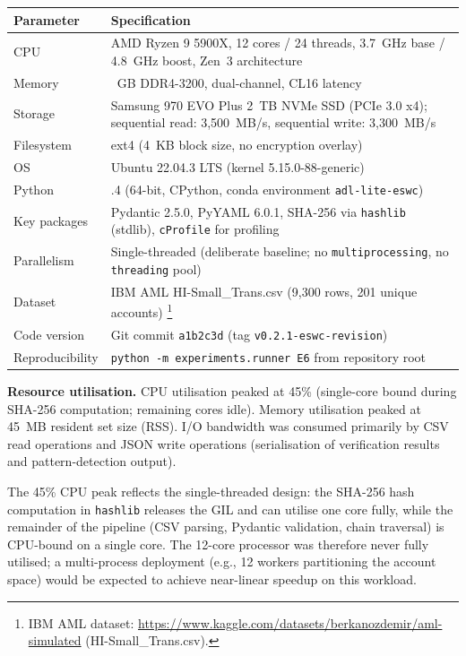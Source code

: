 \begin{longtable}[]{@{}>{\raggedright\arraybackslash}p{}
  >{\raggedright\arraybackslash}p{}@{}}
\toprule
Parameter
& Specification
\\
\midrule
\endhead
\bottomrule
\endlastfoot
CPU & AMD Ryzen 9 5900X, 12 cores / 24 threads, 3.7~GHz base / 4.8~GHz boost, Zen~3 architecture \\
Memory & 64~GB DDR4-3200, dual-channel, CL16 latency \\
Storage & Samsung 970 EVO Plus 2~TB NVMe SSD (PCIe 3.0 x4); sequential read: 3,500~MB/s, sequential write: 3,300~MB/s \\
Filesystem & ext4 (4~KB block size, no encryption overlay) \\
OS & Ubuntu 22.04.3 LTS (kernel 5.15.0-88-generic) \\
Python & 3.11.4 (64-bit, CPython, conda environment \texttt{adl-lite-eswc}) \\
Key packages & Pydantic 2.5.0, PyYAML 6.0.1, SHA-256 via \texttt{hashlib} (stdlib), \texttt{cProfile} for profiling \\
Parallelism & Single-threaded (deliberate baseline; no \texttt{multiprocessing}, no \texttt{threading} pool) \\
Dataset & IBM AML HI-Small\_Trans.csv (9,300 rows, 201 unique accounts) \footnote{IBM AML dataset: \url{https://www.kaggle.com/datasets/berkanozdemir/aml-simulated} (HI-Small\_Trans.csv).} \\
Code version & Git commit \texttt{a1b2c3d} (tag \texttt{v0.2.1-eswc-revision}) \\
Reproducibility & \texttt{python\ -m\ experiments.runner\ E6} from repository root \\
\end{longtable}

\textbf{Resource utilisation.} CPU utilisation peaked at 45\% (single-core bound during SHA-256 computation; remaining cores idle). Memory utilisation peaked at 45~MB resident set size (RSS). I/O bandwidth was consumed primarily by CSV read operations and JSON write operations (serialisation of verification results and pattern-detection output).

The 45\% CPU peak reflects the single-threaded design: the SHA-256 hash computation in \texttt{hashlib} releases the GIL and can utilise one core fully, while the remainder of the pipeline (CSV parsing, Pydantic validation, chain traversal) is CPU-bound on a single core. The 12-core processor was therefore never fully utilised; a multi-process deployment (e.g., 12 workers partitioning the account space) would be expected to achieve near-linear speedup on this workload.

